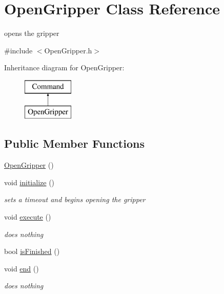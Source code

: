 \hypertarget{classOpenGripper}{\section{Open\-Gripper Class Reference}
\label{classOpenGripper}
}


opens the gripper  




{\ttfamily \#include $<$Open\-Gripper.\-h$>$}

Inheritance diagram for Open\-Gripper\-:\begin{figure}[H]
\begin{center}
\leavevmode
\includegraphics[height=2.000000cm]{classOpenGripper}
\end{center}
\end{figure}
\subsection*{Public Member Functions}
\begin{DoxyCompactItemize}
\item 
\hyperlink{classOpenGripper_af3ca0a56d41c4fbb98e2e5deba76a5a1}{Open\-Gripper} ()
\item 
void \hyperlink{classOpenGripper_a13dc36eb38dc51e85fefbccbef87a981}{initialize} ()
\begin{DoxyCompactList}\small\item\em sets a timeout and begins opening the gripper \end{DoxyCompactList}\item 
void \hyperlink{classOpenGripper_a358b40de6a9c051a2c7f322747c37dad}{execute} ()
\begin{DoxyCompactList}\small\item\em does nothing \end{DoxyCompactList}\item 
bool \hyperlink{classOpenGripper_a334eebec59e348ec33a78d238de85baa}{is\-Finished} ()
\item 
void \hyperlink{classOpenGripper_ad807b567e6ca9c8ef0a4f7a143506546}{end} ()
\begin{DoxyCompactList}\small\item\em does nothing \end{DoxyCompactList}\end{DoxyCompactItemize}
